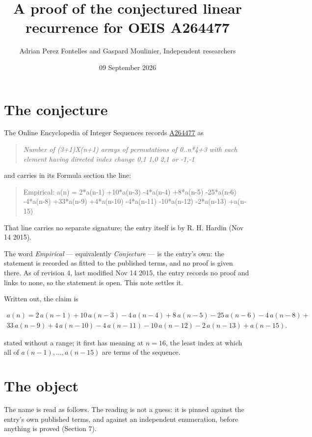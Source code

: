 \documentclass[11pt]{article}
\title{A proof of the conjectured linear recurrence for OEIS A264477}
\author{Adrian Perez Fontelles and Gaspard Moulinier, Independent researchers}
\date{09 September 2026}
\theoremstyle{definition}
\begin{document}
\maketitle
\section{The conjecture}

The Online Encyclopedia of Integer Sequences records \href{https://oeis.org/A264477}{A264477} as

\begin{quote}\itshape Number of (3+1)X(n+1) arrays of permutations of 0..n*4+3 with each element having directed index change 0,1 1,0 2,1 or -1,-1\end{quote}

and carries in its Formula section the line:

\begin{quote}\ttfamily Empirical: a(n) = 2*a(n-1) +10*a(n-3) -4*a(n-4) +8*a(n-5) -25*a(n-6) -4*a(n-8) +33*a(n-9) +4*a(n-10) -4*a(n-11) -10*a(n-12) -2*a(n-13) +a(n-15)\end{quote}

That line carries no separate signature; the entry itself is by R. H. Hardin (Nov 14 2015).

The word {\itshape Empirical} --- equivalently {\itshape Conjecture} --- is the entry's own: the statement is recorded as fitted to the published terms, and no proof is given there. As of revision 4, last modified Nov 14 2015, the entry records no proof and links to none, so the statement is open. This note settles it.

Written out, the claim is

\begin{multline*} a(n) = 2\,a(n-1) + 10\,a(n-3) - 4\,a(n-4) + 8\,a(n-5) - 25\,a(n-6) - 4\,a(n-8) + \\ 33\,a(n-9) + 4\,a(n-10) - 4\,a(n-11) - 10\,a(n-12) - 2\,a(n-13) + a(n-15). \end{multline*}

stated without a range; it first has meaning at $n = 16$, the least index at which all of $a(n-1),\dots,a(n-15)$ are terms of the sequence.

\section{The object}

The name is read as follows. The reading is not a guess: it is pinned against the entry's own published terms, and against an independent enumeration, before anything is proved (Section 7).
\end{document}

